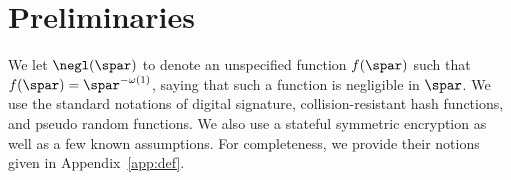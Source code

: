 \section{Preliminaries}\label{sec:pre}
We let ${\negl}(\spar)$ to denote an unspecified function $f(\spar)$ such that
$f(\spar) ={\spar}^{-\omega(1)}$, saying that such a function is negligible in $\spar$.
We use the standard notations of digital signature, collision-resistant hash functions, and pseudo random functions.
We also use a stateful symmetric encryption as well as a few known assumptions.
For completeness, we provide their notions given in Appendix~\ref{app:def}.